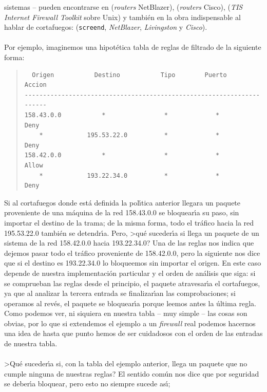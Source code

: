 sistemas -- pueden encontrarse en \cite{kn:cor91} ({\it routers} NetBlazer),
\cite{kn:par98} ({\it routers} Cisco), \cite{kn:ran93a} ({\it TIS Internet 
Firewall Toolkit} sobre Unix) y tambi\'en en la obra indispensable al
hablar de cortafuegos: \cite{kn:bre95} ({\tt screend}, {\it NetBlazer}, {\it 
Livingston} y {\it Cisco}).\\
\\Por ejemplo, imaginemos una hipot\'etica tabla de reglas de filtrado de la 
siguiente forma:
\begin{quote}
\begin{verbatim}
  Origen           Destino           Tipo        Puerto        Accion
----------------------------------------------------------------------
158.43.0.0           *                *             *           Deny
    *            195.53.22.0          *             *           Deny
158.42.0.0           *                *             *           Allow
    *            193.22.34.0          *             *           Deny
\end{verbatim}
\end{quote}
Si al cortafuegos donde est\'a definida la pol\'{\i}tica anterior llegara un
paquete proveniente de una m\'aquina de la red 158.43.0.0 se bloquear\'{\i}a
su paso, sin importar el destino de la trama; de la misma forma, todo el 
tr\'afico hacia la red 195.53.22.0 tambi\'en se detendr\'{\i}a. Pero, >qu\'e
suceder\'{\i}a si llega un paquete de un sistema de la red 158.42.0.0 hacia
193.22.34.0? Una de las reglas nos indica que dejemos pasar todo el tr\'afico 
proveniente de 158.42.0.0, pero la siguiente nos dice que si el destino es 
193.22.34.0 lo bloqueemos sin importar el origen. En este caso depende de
nuestra implementaci\'on particular y el orden de an\'alisis que siga: si se
comprueban las reglas desde el principio, el paquete atravesar\'{\i}a el 
cortafuegos, ya que al analizar la tercera entrada se finalizar\'{\i}an las
comprobaciones; si operamos al rev\'es, el paquete se bloquear\'{\i}a porque
leemos antes la \'ultima regla. Como podemos ver, ni siquiera en nuestra tabla
-- muy simple -- las cosas son obvias, por lo que si extendemos el ejemplo a
un {\it firewall} real podemos hacernos una idea de hasta que punto hemos de 
ser cuidadosos con el orden de las entradas de nuestra tabla.\\
\\>Qu\'e suceder\'{\i}a si, con la tabla del ejemplo anterior, llega un paquete
que no cumple ninguna de nuestras reglas? El sentido com\'un nos dice que por
seguridad se deber\'{\i}a bloquear, pero esto no siempre sucede as\'{\i}; 
